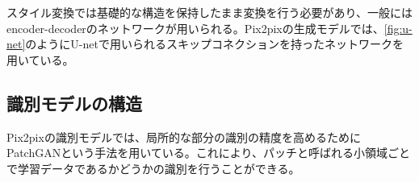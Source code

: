 スタイル変換では基礎的な構造を保持したまま変換を行う必要があり、一般にはencoder-decoderのネットワークが用いられる。Pix2pixの生成モデルでは、\ref{fig:u-net}のようにU-net\cite{u-net}で用いられるスキップコネクションを持ったネットワークを用いている。

\subsection{識別モデルの構造}

Pix2pixの識別モデルでは、局所的な部分の識別の精度を高めるためにPatchGANという手法を用いている。これにより、パッチと呼ばれる小領域ごとで学習データであるかどうかの識別を行うことができる。


